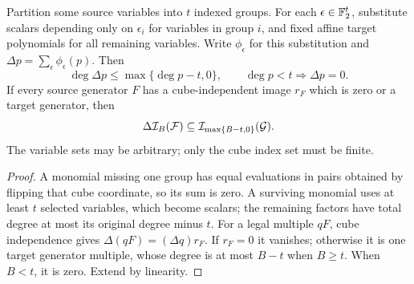 \begin{lemma}\label{lem:cube-drop}
Partition some source variables into \(t\) indexed groups. For each
\(\epsilon\in\mathbb F_2^t\), substitute scalars depending only on \(\epsilon_i\)
for variables in group \(i\), and fixed affine target polynomials for
all remaining variables. Write \(\phi_\epsilon\) for this substitution
and \(\Delta p=\sum_\epsilon\phi_\epsilon(p)\). Then
\[
 \deg\Delta p\le\max\{\deg p-t,0\},\qquad
 \deg p<t\Longrightarrow\Delta p=0.
\]
If every source generator \(F\) has a cube-independent image \(r_F\)
which is zero or a target generator, then
\[
 \Delta\mathcal I_B(\mathcal F)\subseteq
       \mathcal I_{\max\{B-t,0\}}(\mathcal G).
\]
The variable sets may be arbitrary; only the cube index set must be finite.
\end{lemma}
\begin{proof}
A monomial missing one group has equal evaluations in pairs obtained by
flipping that cube coordinate, so its sum is zero. A surviving monomial
uses at least \(t\) selected variables, which become scalars; the remaining
factors have total degree at most its original degree minus \(t\).
For a legal multiple \(qF\), cube independence gives
\(\Delta(qF)=(\Delta q)r_F\). If \(r_F=0\) it vanishes; otherwise it is
one target generator multiple, whose degree is at most \(B-t\) when
\(B\ge t\). When \(B<t\), it is zero. Extend by linearity.
\end{proof}

